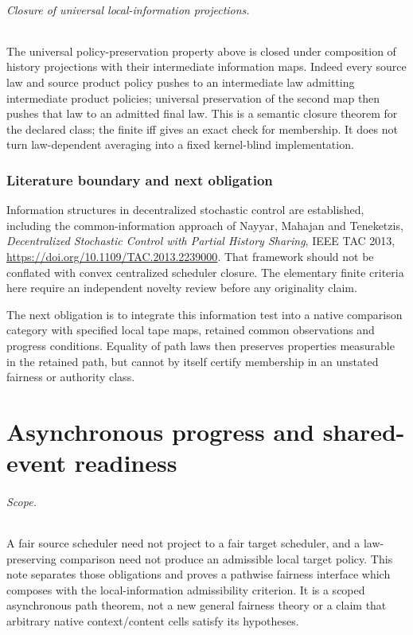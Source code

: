 \documentclass[11pt]{article}
\begin{document}
\paragraph{Closure of universal local-information projections.}
The universal policy-preservation property above is closed under composition of history projections with their intermediate information maps. Indeed every source law and source product policy pushes to an intermediate law admitting intermediate product policies; universal preservation of the second map then pushes that law to an admitted final law. This is a semantic closure theorem for the declared class; the finite iff gives an exact check for membership. It does not turn law-dependent averaging into a fixed kernel-blind implementation.

\section{Literature boundary and next obligation}
Information structures in decentralized stochastic control are established, including the common-information approach of Nayyar, Mahajan and Teneketzis, \emph{Decentralized Stochastic Control with Partial History Sharing}, IEEE TAC 2013, \url{https://doi.org/10.1109/TAC.2013.2239000}. That framework should not be conflated with convex centralized scheduler closure. The elementary finite criteria here require an independent novelty review before any originality claim.

The next obligation is to integrate this information test into a native comparison category with specified local tape maps, retained common observations and progress conditions. Equality of path laws then preserves properties measurable in the retained path, but cannot by itself certify membership in an unstated fairness or authority class.

\part{Asynchronous progress and shared-event readiness}

\paragraph{Scope.} A fair source scheduler need not project to a fair target scheduler, and a law-preserving comparison need not produce an admissible local target policy. This note separates those obligations and proves a pathwise fairness interface which composes with the local-information admissibility criterion. It is a scoped asynchronous path theorem, not a new general fairness theory or a claim that arbitrary native context/content cells satisfy its hypotheses.
\end{document}
